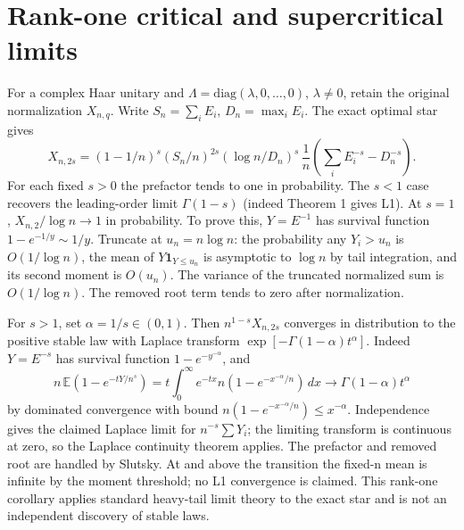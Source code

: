 \documentclass[11pt]{article}
\begin{document}
\section{Rank-one critical and supercritical limits}\label{rank-one-critical-and-supercritical-limits}

For a complex Haar unitary and \(\Lambda=\mathrm{diag}(\lambda,0,\ldots,0)\), \(\lambda\ne0\), retain the original normalization \(X_{n,q}\). Write \(S_n=\sum_i E_i\), \(D_n=\max_i E_i\). The exact optimal star gives \[X_{n,2s}=(1-1/n)^s(S_n/n)^{2s}(\log n/D_n)^s\,\frac1n\left(\sum_i E_i^{-s}-D_n^{-s}\right).\] For each fixed \(s>0\) the prefactor tends to one in probability. The \(s<1\) case recovers the leading-order limit \(\Gamma(1-s)\) (indeed Theorem 1 gives L1). At \(s=1\), \(X_{n,2}/\log n\to1\) in probability. To prove this, \(Y=E^{-1}\) has survival function \(1-e^{-1/y}\sim 1/y\). Truncate at \(u_n=n\log n\): the probability any \(Y_i>u_n\) is \(O(1/\log n)\), the mean of \(Y\mathbf1_{Y\le u_n}\) is asymptotic to \(\log n\) by tail integration, and its second moment is \(O(u_n)\). The variance of the truncated normalized sum is \(O(1/\log n)\). The removed root term tends to zero after normalization.

For \(s>1\), set \(\alpha=1/s\in(0,1)\). Then \(n^{1-s}X_{n,2s}\) converges in distribution to the positive stable law with Laplace transform \(\exp[-\Gamma(1-\alpha)t^\alpha]\). Indeed \(Y=E^{-s}\) has survival function \(1-e^{-y^{-\alpha}}\), and \[n\,\mathbb E(1-e^{-tY/n^s})=t\int_0^\infty e^{-tx} n(1-e^{-x^{-\alpha}/n})\,dx\to \Gamma(1-\alpha)t^\alpha\] by dominated convergence with bound \(n(1-e^{-x^{-\alpha}/n})\le x^{-\alpha}\). Independence gives the claimed Laplace limit for \(n^{-s}\sum Y_i\); the limiting transform is continuous at zero, so the Laplace continuity theorem applies. The prefactor and removed root are handled by Slutsky. At and above the transition the fixed-n mean is infinite by the moment threshold; no L1 convergence is claimed. This rank-one corollary applies standard heavy-tail limit theory to the exact star and is not an independent discovery of stable laws.
\end{document}
